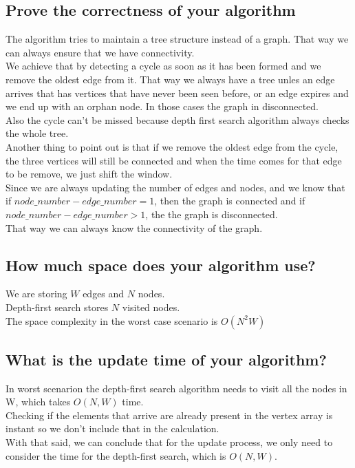 \documentclass[11pt]{article}
\begin{document}
\subsection{Prove the correctness of your algorithm}
The algorithm tries to maintain a tree structure instead of a graph. That way we can always ensure that we have connectivity. \\
We achieve that by detecting a cycle as soon as it has been formed and we remove the oldest edge from it. That way we always have a tree unles an edge arrives that has vertices that have never been seen before, or an edge expires and we end up with an orphan node. In those cases the graph in disconnected. \\
Also the cycle can't be missed because depth first search algorithm always checks the whole tree. \\
Another thing to point out is that if we remove the oldest edge from the cycle, the three vertices will still be connected and when the time comes for that edge to be remove, we just shift the window. \\
Since we are always updating the number of edges and nodes, and we know that if $ node\_number - edge\_number = 1 $, then the graph is connected and if $ node\_number - edge\_number > 1 $, the the graph is disconnected. \\
That way we can always know the connectivity of the graph.

\subsection{How much space does your algorithm use?}
We are storing $ W $ edges and $ N $ nodes. \\
Depth-first search stores $ N $ visited nodes. \\
The space complexity in the worst case scenario is $ O(N^2W) $


\subsection{What is the update time of your algorithm?}
In worst scenarion the depth-first search algorithm needs to visit all the nodes in W, which takes $ O(N, W) $ time. \\
Checking if the elements that arrive are already present in the vertex array is instant so we don't include that in the calculation. \\
With that said, we can conclude that for the update process, we only need to consider the time for the depth-first search, which is $ O(N, W) $.
\end{document}
